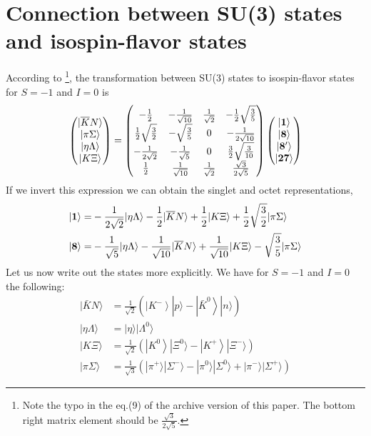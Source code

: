 \documentclass[%
 preprint,
nofootinbib,
 amsmath,amssymb,
 aps,
]{revtex4-2}
\begin{document}
\section{Connection between SU(3) states and isospin-flavor states}
According to \cite{Roca:2008kr}\footnote{Note the typo in the eq.(9) of the archive version of this paper.  The bottom right matrix element should be $\frac{\sqrt{3}}{2\sqrt{5}}$.}, the transformation between SU(3) states to isospin-flavor states for $S=-1$ and $I=0$ is 
\begin{equation}
\begin{pmatrix}
|\overline{K}N\rangle\\
|\pi\Sigma\rangle\\
|\eta\Lambda\rangle\\
|K\Xi\rangle
\end{pmatrix}
=
\begin{pmatrix}
-\frac{1}{2} & -\frac{1}{\sqrt{10}} & \frac{1}{\sqrt{2}} & -\frac{1}{2} \sqrt{\frac{3}{5}} \\
\frac{1}{2} \sqrt{\frac{3}{2}} & -\sqrt{\frac{3}{5}} & 0 & -\frac{1}{2 \sqrt{10}} \\
-\frac{1}{2 \sqrt{2}} & -\frac{1}{\sqrt{5}} & 0 & \frac{3}{2} \sqrt{\frac{3}{10}} \\
\frac{1}{2} & \frac{1}{\sqrt{10}} & \frac{1}{\sqrt{2}} & \frac{\sqrt{3}}{2 \sqrt{5}}
\end{pmatrix}
\begin{pmatrix}
|{\bf1}\rangle\\
|{\bf8}\rangle\\
|{\bf8'}\rangle\\
|{\bf27}\rangle
\end{pmatrix}
\end{equation}
If we invert this expression we can obtain the singlet and octet representations,
\begin{align}
|{\bf1}\rangle=&-\frac{1 }{2 \sqrt{2}}|\eta \Lambda\rangle-\frac{1}{2}|\overline{K}N\rangle+\frac{1}{2}|K\Xi\rangle+\frac{1}{2} \sqrt{\frac{3}{2}}|\pi \Sigma\rangle\\
|{\bf8}\rangle=&-\frac{1}{\sqrt{5}}|\eta \Lambda \rangle-\frac{1}{\sqrt{10}}|\overline{K}N\rangle+\frac{1}{\sqrt{10}}|K\Xi\rangle-\sqrt{\frac{3}{5}} |\pi \Sigma\rangle
\end{align}
Let us now write out the states more explicitly.  We have for $S=-1$ and $I=0$ the following:
\begin{align}
|\bar KN\rangle &=\frac{1}{\sqrt{2}}\left(\left|K^{-}\right\rangle|p\rangle-\left|\bar{K}^{0}\right\rangle|n\rangle\right)\\
|\eta \Lambda\rangle &=|\eta\rangle |\Lambda^0\rangle\\
|K\Xi\rangle &=\frac{1}{\sqrt{2}}\left(\left|K^{0}\right\rangle|\Xi^0\rangle-\left|K^{+}\right\rangle|\Xi^-\rangle\right)\\
|\pi\Sigma\rangle&=\frac{1}{\sqrt{3}}\left(|\pi^+\rangle|\Sigma^-\rangle-|\pi^0\rangle|\Sigma^0\rangle+|\pi^-\rangle|\Sigma^+\rangle\right)
\end{align}
\clearpage

\end{document}
